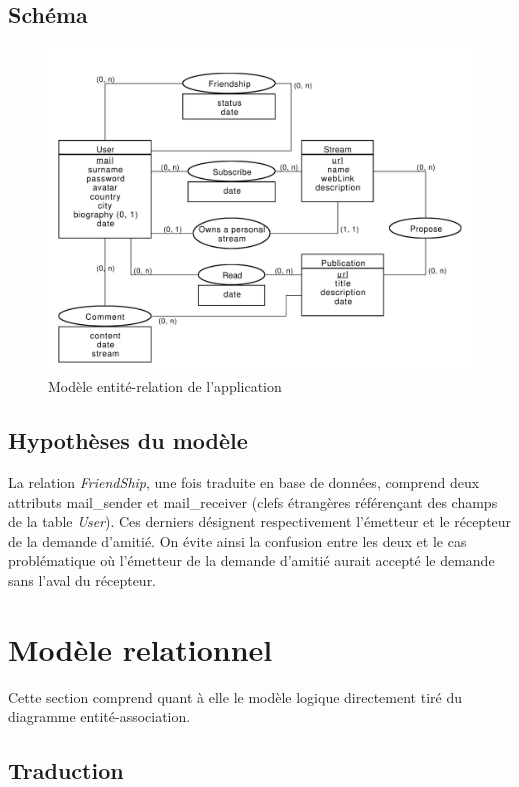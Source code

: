 \documentclass[a4paper,10pt]{article}
\begin{document}
\subsection{Schéma}

	\begin{figure}[h!]
	    \centering
	    \includegraphics[width=15cm]{Entite-Relation-2.pdf}
	    \caption{Modèle entité-relation de l'application}
	    \label{fig:Entite-Relation}
	\end{figure}

\subsection{Hypothèses du modèle}

La relation \textsl{FriendShip}, une fois traduite en base de données, comprend deux attributs mail\_sender et mail\_receiver (clefs étrangères référençant des champs de la table \textsl{User}). Ces derniers désignent respectivement l'émetteur et le récepteur de la demande d'amitié. On évite ainsi la confusion entre les deux et le cas problématique où l'émetteur de la demande d'amitié aurait accepté le demande sans l'aval du récepteur.

\section{Modèle relationnel}

Cette section comprend quant à elle le modèle logique directement tiré du diagramme entité-association. 

\subsection{Traduction}
\end{document}
